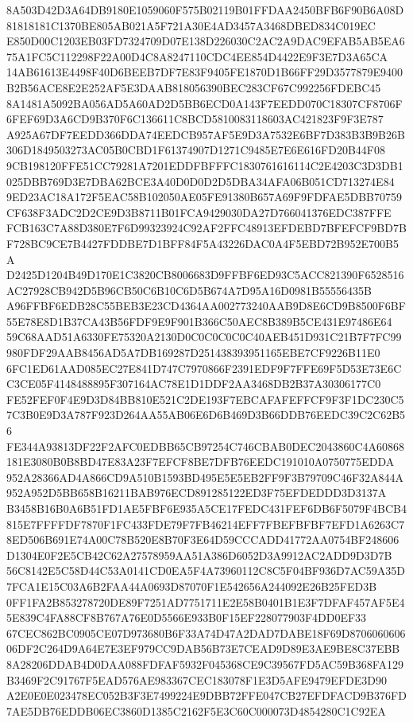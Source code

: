 \documentclass[UTF8,fontset=fandol,zihao=-4,a4paper]{ctexart}
\begin{document}
{{8A503D42D3A64DB9180E1059060F575B02119B01FFDAA2450BFB6F90B6A08D81818181C1370BE805AB021A5F721A30E4AD3457A3468DBED834C019EC
E850D00C1203EB03FD7324709D07E138D226030C2AC2A9DAC9EFAB5AB5EA675A1FC5C112298F22A00D4C8A8247110CDC4EE854D4422E9F3E7D3A65CA
14AB61613E4498F40D6BEEB7DF7E83F9405FE1870D1B66FF29D3577879E9400B2B56ACE8E2E252AF5E3DAAB818056390BEC283CF67C992256FDEBC45
8A1481A5092BA056AD5A60AD2D5BB6ECD0A143F7EEDD070C18307CF8706F6FEF69D3A6CD9B370F6C136611C8BCD5810083118603AC421823F9F3E787
A925A67DF7EEDD366DDA74EEDCB957AF5E9D3A7532E6BF7D383B3B9B26B306D1849503273AC05B0CBD1F61374907D1271C9485E7E6E616FD20B44F08
9CB198120FFE51CC79281A7201EDDFBFFFC1830761616114C2E4203C3D3DB1025DBB769D3E7DBA62BCE3A40D0D0D2D5DBA34AFA06B051CD713274E84
9ED23AC18A172F5EAC58B102050AE05FE91380B657A69F9FDFAE5DBB70759CF638F3ADC2D2CE9D3B8711B01FCA9429030DA27D766041376EDC387FFE
FCB163C7A88D380E7F6D99323924C92AF2FFC48913EFDEBD7BFEFCF9BD7BF728BC9CE7B4427FDDBE7D1BFF84F5A43226DAC0A4F5EBD72B952E700B5A
D2425D1204B49D170E1C3820CB8006683D9FFBF6ED93C5ACC821390F6528516AC27928CB942D5B96CB50C6B10C6D5B674A7D95A16D0981B55556435B
A96FFBF6EDB28C55BEB3E23CD4364AA002773240AAB9D8E6CD9B8500F6BF55E78E8D1B37CA43B56FDF9E9F901B366C50AEC8B389B5CE431E97486E64
59C68AAD51A6330FE75320A2130D0C0C0C0C0C40AEB451D931C21B7F7FC99980FDF29AAB8456AD5A7DB169287D251438393951165EBE7CF9226B11E0
6FC1ED61AAD085EC27E841D747C7970866F2391EDF9F7FFE69F5D53E73E6CC3CE05F4148488895F307164AC78E1D1DDF2AA3468DB2B37A30306177C0
FE52FEF0F4E9D3D84BB810E521C2DE193F7EBCAFAFEFFCF9F3F1DC230C57C3B0E9D3A787F923D264AA55AB06E6D6B469D3B66DDB76EEDC39C2C62B56
FE344A93813DF22F2AFC0EDBB65CB97254C746CBAB0DEC2043860C4A60868181E3080B0B8BD47E83A23F7EFCF8BE7DFB76EEDC191010A0750775EDDA
952A28366AD4A866CD9A510B1593BD495E5E5EB2FF9F3B79709C46F32A844A952A952D5BB658B16211BAB976ECD891285122ED3F75EFDEDDD3D3137A
B3458B16B0A6B51FD1AE5FBF6E935A5CE17FEDC431FEF6DB6F5079F4BCB4815E7FFFFDF7870F1FC433FDE79F7FB46214EFF7FBEFBFBF7EFD1A6263C7
8ED506B691E74A00C78B520E8B70F3E64D59CCCADD41772AA0754BF248606D1304E0F2E5CB42C62A27578959AA51A386D6052D3A9912AC2ADD9D3D7B
56C8142E5C58D44C53A0141CD0EA5F4A73960112C8C5F04BF936D7AC59A35D7FCA1E15C03A6B2FAA44A0693D87070F1E542656A244092E26B25FED3B
0FF1FA2B853278720DE89F7251AD7751711E2E58B0401B1E3F7DFAF457AF5E45E839C4FA88CF8B767A76E0D5566E933B0F15EF228077903F4DD0EF33
67CEC862BC0905CE07D973680B6F33A74D47A2DAD7DABE18F69D870606060606DF2C264D9A64E7E3EF979CC9DAB56B73E7CEAD9D89E3AE9BE8C37EBB
8A28206DDAB4D0DAA088FDFAF5932F045368CE9C39567FD5AC59B368FA129B3469F2C91767F5EAD576AE983367CEC183078F1E3D5AFE9479EFDE3D90
A2E0E0E023478EC052B3F3E7499224E9DBB72FFE047CB27EFDFACD9B376FD7AE5DB76EDDB06EC3860D1385C2162F5E3C60C000073D4854280C1C92EA
}}
\end{document}
